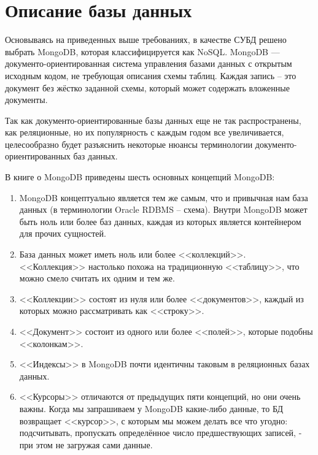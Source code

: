 \documentclass[14pt]{extreport}
\begin{document}
\section{Описание базы данных}

Основываясь на приведенных выше требованиях, в качестве СУБД решено выбрать MongoDB, которая классифицируется как NoSQL. MongoDB — документо-ориентированная система управления базами данных с открытым исходным кодом, не требующая описания схемы таблиц. Каждая запись – это документ без жёстко заданной схемы, который может содержать вложенные документы.

Так как документо-ориентированные базы данных еще не так распространены, как реляционные, но их популярность с каждым годом все увеличивается, целесообразно будет разъяснить некоторые нюансы терминологии документо-ориентированных баз данных. 

В книге о MongoDB\cite{bib:mongo} приведены шесть основных концепций MongoDB:

\begin{enumerate}

\item MongoDB концептуально является тем же самым, что и привычная нам база данных (в терминологии Oracle RDBMS -- схема). Внутри MongoDB может быть ноль или более баз данных, каждая из которых является контейнером для прочих сущностей.

\item База данных может иметь ноль или более <<коллекций>>. <<Коллекция>> настолько похожа на традиционную <<таблицу>>, что можно смело считать их одним и тем же.

\item <<Коллекции>> состоят из нуля или более <<документов>>, каждый из которых можно рассматривать как <<строку>>.

\item <<Документ>> состоит из одного или более <<полей>>, которые подобны <<колонкам>>.

\item <<Индексы>> в MongoDB почти идентичны таковым в реляционных базах данных.

\item <<Курсоры>> отличаются от предыдущих пяти концепций, но они очень важны. Когда мы запрашиваем у MongoDB какие-либо данные, то БД возвращает <<курсор>>, с которым мы можем делать все что угодно: подсчитывать, пропускать определённое число предшествующих записей, - при этом не загружая сами данные.

\end{enumerate}
\end{document}
